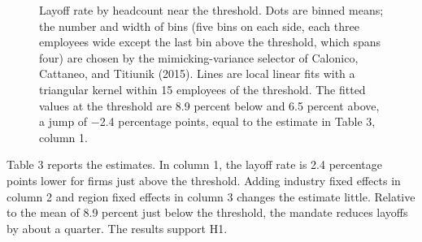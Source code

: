 \documentclass[12pt]{article}
\begin{document}
\begin{figure}[htbp]
\centering
{}
\caption{Layoff rate by headcount near the threshold. Dots are binned means; the number and width of bins (five bins on each side, each three employees wide except the last bin above the threshold, which spans four) are chosen by the mimicking-variance selector of Calonico, Cattaneo, and Titiunik (2015). Lines are local linear fits with a triangular kernel within 15 employees of the threshold. The fitted values at the threshold are 8.9 percent below and 6.5 percent above, a jump of $-$2.4 percentage points, equal to the estimate in Table 3, column 1.}
\end{figure}

Table 3 reports the estimates. In column 1, the layoff rate is 2.4 percentage points lower for firms just above the threshold. Adding industry fixed effects in column 2 and region fixed effects in column 3 changes the estimate little. Relative to the mean of 8.9 percent just below the threshold, the mandate reduces layoffs by about a quarter. The results support H1.
\end{document}

